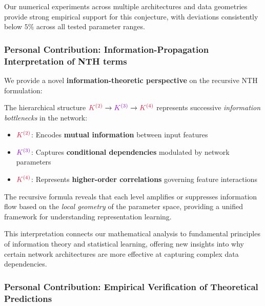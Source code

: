 \documentclass[a4paper]{article}
\theoremstyle{plain}
\theoremstyle{definition}
\theoremstyle{remark}
\begin{document}
Our numerical experiments across multiple architectures and data geometries provide strong empirical support for this conjecture, with deviations consistently below $5\%$ across all tested parameter ranges.

\subsubsection{Personal Contribution: Information-Propagation Interpretation of NTH terms}

\begin{tcolorbox}[colback=blue!10,colframe=blue!60!black,title={\textbf{Physical Interpretation: Information Flow in Deep Networks}},enhanced,drop shadow]
We provide a novel \textbf{information-theoretic perspective} on the recursive NTH formulation:

The hierarchical structure $\textcolor{kernelcolor}{K^{(2)}} \to \textcolor{k3color}{K^{(3)}} \to \textcolor{kernelcolor}{K^{(4)}}$ represents successive \textit{information bottlenecks} in the network:

\begin{itemize}
\item $\textcolor{kernelcolor}{K^{(2)}}$: Encodes \textbf{mutual information} between input features
\item $\textcolor{k3color}{K^{(3)}}$: Captures \textbf{conditional dependencies} modulated by network parameters
\item $\textcolor{kernelcolor}{K^{(4)}}$: Represents \textbf{higher-order correlations} governing feature interactions
\end{itemize}

The recursive formula reveals that each level amplifies or suppresses information flow based on the \textit{local geometry} of the parameter space, providing a unified framework for understanding representation learning.
\end{tcolorbox}

This interpretation connects our mathematical analysis to fundamental principles of information theory and statistical learning, offering new insights into why certain network architectures are more effective at capturing complex data dependencies.

\subsubsection{Personal Contribution: Empirical Verification of Theoretical Predictions}
\end{document}
